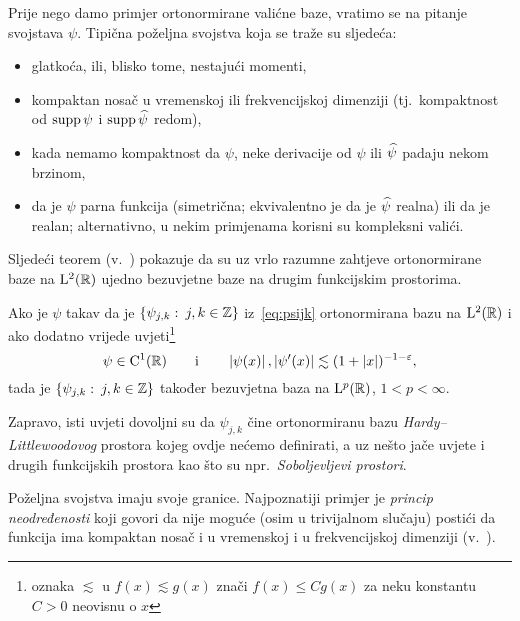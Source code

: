 \documentclass[main.tex]{subfiles}
\newcommand{\mr}[1]{\mathrm{#1}}
\begin{document}
Prije nego damo primjer ortonormirane valićne baze,
vratimo se na pitanje svojstava \( \psi \).
Tipična poželjna svojstva koja se traže su sljedeća:
\begin{itemize}
	\item glatkoća, ili, blisko tome, nestajući momenti,
	\item kompaktan nosač u vremenskoj ili frekvencijskoj dimenziji (tj.\ kompaktnost od \( \operatorname{supp} \psi \) i \( \operatorname{supp} \widehat{\psi} \) redom),
	\item kada nemamo kompaktnost da \( \psi \), neke derivacije od \( \psi \) ili \( \widehat{\psi} \) padaju nekom brzinom,
	\item da je \( \psi  \) parna funkcija (simetrična; ekvivalentno je da je \( \widehat{\psi} \) realna) ili da je
	      realan; alternativno, u nekim primjenama korisni su kompleksni valići.
\end{itemize}
Sljedeći teorem (v.~\cite[]{daub}) pokazuje da su uz vrlo razumne zahtjeve ortonormirane baze na
\( \mathrm{L}^2(\mathbb{R}) \) ujedno bezuvjetne baze na drugim funkcijskim prostorima.

\newcommand{\fusnota}{\footnote{oznaka \( \lesssim \) u \( f(x) \lesssim g(x) \) znači \( f(x) \le Cg(x) \) za neku konstantu \( C > 0 \) neovisnu o \( x \)}}
\begin{teorem} \label{bezbazaLp}
	Ako je \( \psi \) takav da je \( \left\{ \psi_{j,k} \, \colon \, j,k \in \mathbb{Z} \right\} \) iz~\eqref{eq:psijk} ortonormirana bazu na \( \mathrm{L}^2(\mathbb{R}) \) i ako dodatno vrijede uvjeti\fusnota
	\begin{equation} \label{dovuvjetipsi}
		\psi \in \mr C^1(\R) \qquad \mathrm i \qquad \abs{\psi(x)}, \abs{\psi'(x)} \lesssim (1 + \abs x)^{-1-\varepsilon},
	\end{equation}
	tada je \( \left\{ \psi_{j,k} \, \colon \, j,k \in \mathbb Z \right\} \) također bezuvjetna baza na \( \mathrm{L}^p(\mathbb{R}) \), \( 1 < p < \infty \).
\end{teorem}
Zapravo, isti uvjeti dovoljni su da \( \psi_{j,k} \) čine ortonormiranu bazu \emph{Hardy--Littlewoodovog}
prostora kojeg ovdje nećemo definirati, a uz nešto jače uvjete i drugih funkcijskih prostora kao što
su npr.\ \emph{Soboljevljevi prostori}.

Poželjna svojstva imaju svoje granice. Najpoznatiji
primjer je \emph{princip neodređenosti} koji govori
da nije moguće (osim u trivijalnom slučaju)
postići da funkcija ima kompaktan nosač i u
vremenskoj i u frekvencijskoj dimenziji (v.~\cite[theorem~4]{kovac-wroclaw}).
\end{document}
